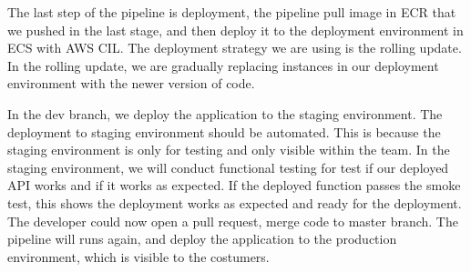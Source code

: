 \par
\label{deploy}
The last step of the pipeline is deployment, the pipeline pull image in ECR that we pushed in the last stage, and then deploy it to the deployment environment in ECS with AWS CIL. The deployment strategy we are using is the rolling update. In the rolling update, we are gradually replacing instances in our deployment environment with the newer version of code.
\par
In the dev branch, we deploy the application to the staging environment. The deployment to staging environment should be automated. This is because the staging environment is only for testing and only visible within the team. 
In the staging environment, we will conduct functional testing for test if our deployed API works and if it works as expected. If the deployed function passes the smoke test, this shows the deployment works as expected and ready for the deployment. The developer could now open a pull request, merge code to master branch. The pipeline will runs again, and deploy the application to the production environment, which is visible to the costumers.


